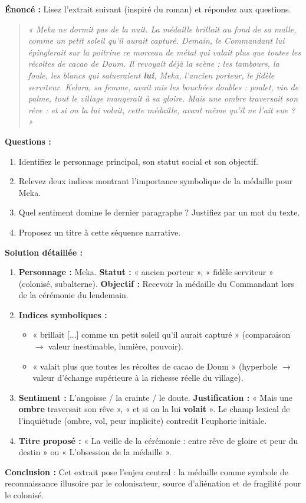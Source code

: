 \documentclass[11pt]{article}
\newcommand{\cle}[1]{{\popxbold\color{popdark}#1}}
\begin{document}
\begin{exoresolu}
\textbf{Énoncé :} Lisez l'extrait suivant (inspiré du roman) et répondez aux questions.
\begin{quote}
\emph{« Meka ne dormit pas de la nuit. La médaille brillait au fond de sa malle, comme un petit soleil qu'il aurait capturé. Demain, le Commandant lui épinglerait sur la poitrine ce morceau de métal qui valait plus que toutes les récoltes de cacao de Doum. Il revoyait déjà la scène : les tambours, la foule, les blancs qui salueraient \textbf{lui}, Meka, l'ancien porteur, le fidèle serviteur. Kelara, sa femme, avait mis les bouchées doubles : poulet, vin de palme, tout le village mangerait à sa gloire. Mais une ombre traversait son rêve : et si on la lui volait, cette médaille, avant même qu'il ne l'ait eue ? »}
\end{quote}
\textbf{Questions :}
\begin{enumerate}
    \item Identifiez le personnage principal, son statut social et son objectif.
    \item Relevez deux indices montrant l'importance symbolique de la médaille pour Meka.
    \item Quel sentiment domine le dernier paragraphe ? Justifiez par un mot du texte.
    \item Proposez un titre à cette séquence narrative.
\end{enumerate}
\tcblower
\textbf{Solution détaillée :}
\begin{enumerate}
    \item \textbf{Personnage :} Meka. \textbf{Statut :} « ancien porteur », « fidèle serviteur » (colonisé, subalterne). \textbf{Objectif :} Recevoir la médaille du Commandant lors de la cérémonie du lendemain.
    \item \textbf{Indices symboliques :}
          \begin{itemize}
              \item « brillait [...] comme un petit soleil qu'il aurait capturé » (comparaison $\rightarrow$ valeur inestimable, lumière, pouvoir).
              \item « valait plus que toutes les récoltes de cacao de Doum » (hyperbole $\rightarrow$ valeur d'échange supérieure à la richesse réelle du village).
          \end{itemize}
    \item \textbf{Sentiment :} L'\cle{angoisse} / la \cle{crainte} / le \cle{doute}. \textbf{Justification :} « Mais une \textbf{ombre} traversait son rêve », « et si on la lui \textbf{volait} ». Le champ lexical de l'inquiétude (ombre, vol, peur implicite) contredit l'euphorie initiale.
    \item \textbf{Titre proposé :} « La veille de la cérémonie : entre rêve de gloire et peur du destin » ou « L'obsession de la médaille ».
\end{enumerate}
\textbf{Conclusion :} Cet extrait pose l'enjeu central : la médaille comme symbole de reconnaissance illusoire par le colonisateur, source d'aliénation et de fragilité pour le colonisé.
\end{exoresolu}
\end{document}
